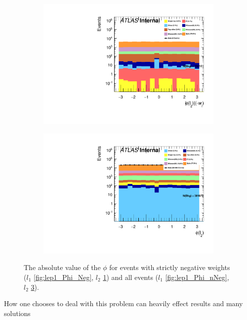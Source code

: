 \begin{figure}
{\begin{subfigure}{.425\textwidth}
        \includegraphics[width=\textwidth]{Figures/FeaturesHistograms/lep2_Phi_Neg.pdf}
        \caption{}
        \label{fig:lep2_Phi_Neg}
    \end{subfigure}
    \hfill
    \begin{subfigure}{.425\textwidth}
        \includegraphics[width=\textwidth]{Figures/FeaturesHistograms/lep2_Phi_nNeg.pdf}
        \caption{}
        \label{fig:lep2_Phi_nNeg}
    \end{subfigure}
    }
    \caption{The absolute value of the $\phi$ for events with strictly negative weights 
    ($l_1$ \ref{fig:lep1_Phi_Neg}, $l_2$ \ref{fig:lep2_Phi_Neg}) and all events
    ($l_1$ \ref{fig:lep1_Phi_nNeg}, $l_2$ \ref{fig:lep2_Phi_nNeg}). }

\end{figure}
How one chooses to deal with this problem can heavily effect results and many solutions 

